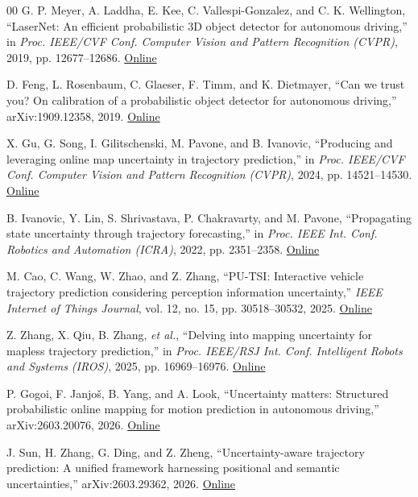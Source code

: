 \documentclass[lettersize,journal]{IEEEtran}
\begin{document}
\begin{thebibliography}{00}
 G. P. Meyer, A. Laddha, E. Kee, C. Vallespi-Gonzalez, and C. K. Wellington, ``LaserNet: An efficient probabilistic 3D object detector for autonomous driving,'' in \textit{Proc. IEEE/CVF Conf. Computer Vision and Pattern Recognition (CVPR)}, 2019, pp. 12677--12686. \href{https://openaccess.thecvf.com/content_CVPR_2019/html/Meyer_LaserNet_An_Efficient_Probabilistic_3D_Object_Detector_for_Autonomous_Driving_CVPR_2019_paper.html}{Online}

 D. Feng, L. Rosenbaum, C. Glaeser, F. Timm, and K. Dietmayer, ``Can we trust you? On calibration of a probabilistic object detector for autonomous driving,'' arXiv:1909.12358, 2019. \href{https://arxiv.org/abs/1909.12358}{Online}

 X. Gu, G. Song, I. Gilitschenski, M. Pavone, and B. Ivanovic, ``Producing and leveraging online map uncertainty in trajectory prediction,'' in \textit{Proc. IEEE/CVF Conf. Computer Vision and Pattern Recognition (CVPR)}, 2024, pp. 14521--14530. \href{https://openaccess.thecvf.com/content/CVPR2024/html/Gu_Producing_and_Leveraging_Online_Map_Uncertainty_in_Trajectory_Prediction_CVPR_2024_paper.html}{Online}

 B. Ivanovic, Y. Lin, S. Shrivastava, P. Chakravarty, and M. Pavone, ``Propagating state uncertainty through trajectory forecasting,'' in \textit{Proc. IEEE Int. Conf. Robotics and Automation (ICRA)}, 2022, pp. 2351--2358. \href{https://doi.org/10.1109/ICRA46639.2022.9811776}{Online}

 M. Cao, C. Wang, W. Zhao, and Z. Zhang, ``PU-TSI: Interactive vehicle trajectory prediction considering perception information uncertainty,'' \textit{IEEE Internet of Things Journal}, vol. 12, no. 15, pp. 30518--30532, 2025. \href{https://doi.org/10.1109/JIOT.2025.3570741}{Online}

 Z. Zhang, X. Qiu, B. Zhang, \textit{et al.}, ``Delving into mapping uncertainty for mapless trajectory prediction,'' in \textit{Proc. IEEE/RSJ Int. Conf. Intelligent Robots and Systems (IROS)}, 2025, pp. 16969--16976. \href{https://arxiv.org/abs/2507.18498}{Online}

 P. Gogoi, F. Janjoš, B. Yang, and A. Look, ``Uncertainty matters: Structured probabilistic online mapping for motion prediction in autonomous driving,'' arXiv:2603.20076, 2026. \href{https://doi.org/10.48550/arXiv.2603.20076}{Online}

 J. Sun, H. Zhang, G. Ding, and Z. Zheng, ``Uncertainty-aware trajectory prediction: A unified framework harnessing positional and semantic uncertainties,'' arXiv:2603.29362, 2026. \href{https://doi.org/10.48550/arXiv.2603.29362}{Online}


\end{thebibliography}
\end{document}
